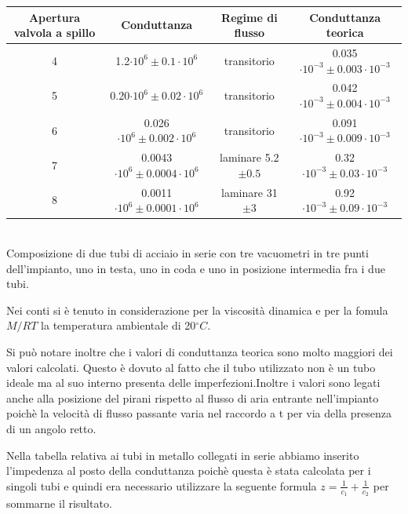 \documentclass[a4paper,11pt]{article}
\begin{document}
\begin{center}
\begin{tabular}{|c|c|c|c|}
\hline Apertura valvola a spillo & Conduttanza & Regime di flusso & Conduttanza teorica \\ 
\hline 4 & 1.2$\cdot10^{6}\pm 0.1\cdot10^{6} $ & transitorio & 0.035 $\cdot10^{-3}\pm 0.003\cdot10^{-3}$ \\ 
\hline 5 & 0.20$\cdot10^{6}\pm 0.02\cdot10^{6}$ & transitorio & 0.042 $\cdot10^{-3}\pm 0.004\cdot10^{-3}$\\ 
\hline 6 & 0.026$\cdot10^{6}\pm 0.002\cdot10^{6}$ & transitorio & 0.091$\cdot10^{-3}\pm 0.009\cdot10^{-3}$ \\
\hline 7 & 0.0043$\cdot10^{6}\pm 0.0004\cdot10^{6}$ & laminare 5.2$\pm0.5$ & 0.32$\cdot10^{-3}\pm 0.03\cdot10^{-3}$ \\
\hline 8 & 0.0011$\cdot10^{6}\pm 0.0001\cdot10^{6}$ & laminare 31$\pm3$ & 0.92$\cdot10^{-3}\pm 0.09\cdot10^{-3}$ \\ 
\hline 
\end{tabular}\\
\vspace{5pt}
Composizione di due tubi di acciaio in serie con tre vacuometri in tre punti dell'impianto, uno in testa, uno in coda e uno in posizione intermedia fra i due tubi.
\vspace{10pt}
\end{center}
Nei conti si è tenuto in considerazione per la viscosità dinamica e per la fomula $ M/RT $ la temperatura ambientale di 20$^\circ C$.

Si può notare inoltre che i valori di conduttanza teorica sono molto maggiori dei valori calcolati. Questo è dovuto al fatto che il tubo utilizzato non è un tubo ideale ma al suo interno presenta delle imperfezioni.Inoltre i valori sono legati anche alla posizione del pirani rispetto al flusso di aria entrante nell'impianto poichè la velocità di flusso passante varia nel raccordo a t per via della presenza di un angolo retto.

Nella tabella relativa ai tubi in metallo collegati in serie abbiamo inserito l'impedenza al posto della conduttanza poichè questa è stata calcolata per i singoli tubi e quindi era necessario utilizzare la seguente formula $z=\frac{1}{c_1}+\frac{1}{c_2} $ per sommarne il risultato.
\end{document}
